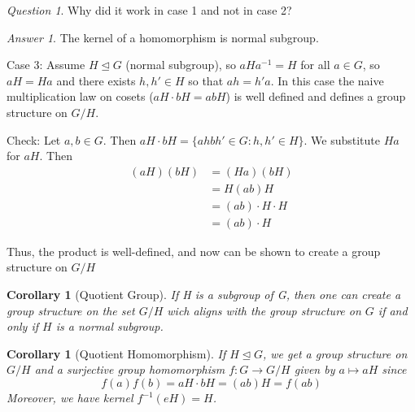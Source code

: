 \documentclass[12pt]{article}
\newtheorem{cor}[thm]{Corollary}
\theoremstyle{definition}
\theoremstyle{remark}
\newtheorem*{qst}{Question}
\newtheorem*{ans}{Answer}
\numberwithin{equation}{section}
\newcommand\nsub{\trianglelefteq}
\begin{document}
\begin{qst}
        Why did it work in case 1 and not in case 2?
\end{qst}

\begin{ans}
        The kernel of a homomorphism is normal subgroup.


        Case 3: Assume $H \nsub G$ (normal subgroup), so $aHa^{-1} = H$ for all $a \in G$, so $aH = Ha$ and there exists $h,h' \in H$ so that $ah = h'a$. In this case the naive multiplication law on cosets ($aH\cdot bH = abH$) is well defined and defines a group structure on $G/H$. 


        Check: Let $a,b \in G$. Then $aH\cdot bH = \{ahbh' \in G:h,h' \in H\}$. We substitute $Ha$ for $aH$. Then \begin{align*}
                (aH)(bH)&=(Ha)(bH) \tag{By normality}\\
                &=H(ab)H \tag{By associativity} \\
                &= (ab)\cdot H \cdot H \tag{By normality again} \\
                &= (ab)\cdot H \tag{Since H is a subgroup}
        \end{align*}

        Thus, the product is well-defined, and now can be shown to create a group structure on $G/H$
\end{ans}

\vspace{15pt}

\begin{cor}[Quotient Group]
        If H is a subgroup of G, then one can create a group structure on the set $G/H$ wich aligns with the group structure on $G$ if and only if $H$ is a normal subgroup.
\end{cor}

\vspace{15pt}

\begin{cor}[Quotient Homomorphism]
        If $H \nsub G$, we get a group structure on $G/H$ and a surjective group homomorphism $f:G \rightarrow G/H$ given by $a\mapsto aH$ since \begin{equation}
                f(a)f(b)=aH\cdot bH = (ab)H = f(ab)
        \end{equation}
        Moreover, we have kernel $f^{-1}(eH) = H$. 
\end{cor}

\vspace{15pt}
\end{document}
